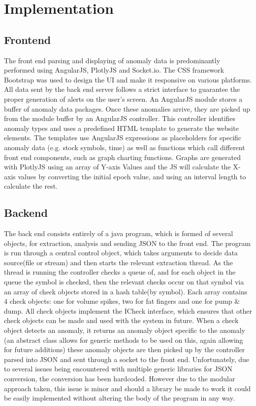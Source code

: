 \documentclass[12pt]{article}
\begin{document}
\section{Implementation}
  \subsection{Frontend}
  The front end parsing and displaying of anomaly data is predominantly performed using AngularJS, PlotlyJS and Socket.io.
  The CSS framework Bootstrap was used to design the UI and make it responsive on various platforms.
  All data sent by the back end server follows a strict interface to guarantee the proper generation of alerts on the user’s screen. An AngularJS module stores a buffer of anomaly data packages.
  Once these anomalies arrive, they are picked up from the module buffer by an AngularJS controller. This controller identifies anomaly types and uses a predefined HTML template to generate the website elements.
  The templates use AngularJS expressions as placeholders for specific anomaly data (e.g. stock symbols, time) as well as functions which call different front end components, such as graph charting functions.
  Graphs are generated with PlotlyJS using an array of Y-axis Values and the JS will calculate the X-axis values by converting the initial epoch value, and using an interval length to calculate the rest.
  \subsection{Backend}
  The back end consists entirely of a java program, which is formed of several objects, for extraction, analysis and sending JSON to the front end.
  The program is run through a central control object, which takes arguments to decide data source(file or stream) and then starts the relevant extraction thread. As the thread is running the controller checks a queue of, and for each object in the queue the symbol is checked, then the relevant checks occur on that symbol via an array of check objects stored in a hash table(by symbol).
  Each array contains 4 check objects: one for volume spikes, two for fat fingers and one for pump \& dump. All check objects implement the ICheck interface, which ensures that other check objects can be made and used with the system in future.
  When a check object detects an anomaly, it returns an anomaly object specific to the anomaly (an abstract class allows for generic methods to be used on this, again allowing for future additions) these anomaly objects are then picked up by the controller parsed into JSON and sent through a socket to the front end. Unfortunately, due to several issues being encountered with multiple generic libraries for JSON conversion, the conversion has been hardcoded.
  However due to the modular approach taken, this issue is minor and should a library be made to work it could be easily implemented without altering the body of the program in any way.
\end{document}
